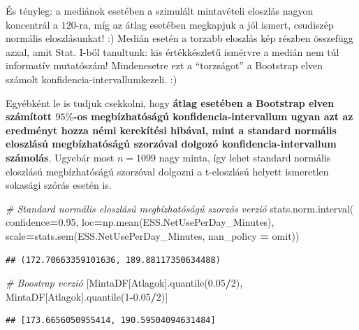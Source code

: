 \documentclass[
]{book}
\newenvironment{Shaded}{\begin{snugshade}}{\end{snugshade}}
\newcommand{\CommentTok}[1]{\textcolor[rgb]{0.56,0.35,0.01}{\textit{#1}}}
\newcommand{\DecValTok}[1]{\textcolor[rgb]{0.00,0.00,0.81}{#1}}
\newcommand{\FloatTok}[1]{\textcolor[rgb]{0.00,0.00,0.81}{#1}}
\newcommand{\NormalTok}[1]{#1}
\newcommand{\OperatorTok}[1]{\textcolor[rgb]{0.81,0.36,0.00}{\textbf{#1}}}
\newcommand{\StringTok}[1]{\textcolor[rgb]{0.31,0.60,0.02}{#1}}
\begin{document}
És tényleg: a mediánok esetében a szimulált mintavételi eloszlás nagyon koncentrál a \(120\)-ra, míg az átlag esetében megkapjuk a jól ismert, csudiszép normális eloszlásunkat! :)
Medián esetén a torzabb eloszlás kép részben összefügg azzal, amit Stat. I-ből tanultunk: kis értékkészletű ismérvre a medián nem túl informatív mutatószám! Mindenesetre ezt a ``torzságot'' a Bootstrap elven számolt konfidencia-intervallumkezeli. :)

Egyébként le is tudjuk csekkolni, hogy \textbf{átlag esetében a Bootstrap elven számított \(95\%\)-os megbízhatóságú konfidencia-intervallum ugyan azt az eredményt hozza némi kerekítési hibával, mint a standard normális eloszlású megbízhatóságú szorzóval dolgozó konfidencia-intervallum számolás}. Ugyebár most \(n=1099\) nagy minta, így lehet standard normális eloszlású megbízhatóságú szorzóval dolgozni a t-eloszlású helyett ismeretlen sokasági szórás esetén is.

\begin{Shaded}
\begin{Highlighting}[]
\CommentTok{\# Standard normális eloszlású megbízhatóságú szorzós verzió}
\NormalTok{stats.norm.interval(}
\NormalTok{  confidence}\OperatorTok{=}\FloatTok{0.95}\NormalTok{,}
\NormalTok{  loc}\OperatorTok{=}\NormalTok{np.mean(ESS.NetUsePerDay\_Minutes),}
\NormalTok{  scale}\OperatorTok{=}\NormalTok{stats.sem(ESS.NetUsePerDay\_Minutes, nan\_policy }\OperatorTok{=} \StringTok{\textquotesingle{}omit\textquotesingle{}}\NormalTok{))}
\end{Highlighting}
\end{Shaded}

\begin{verbatim}
## (172.70663359101636, 189.88117350634488)
\end{verbatim}

\begin{Shaded}
\begin{Highlighting}[]
  
\CommentTok{\# Boostrap verzió}
\NormalTok{[MintaDF[}\StringTok{\textquotesingle{}Atlagok\textquotesingle{}}\NormalTok{].quantile(}\FloatTok{0.05}\OperatorTok{/}\DecValTok{2}\NormalTok{), MintaDF[}\StringTok{\textquotesingle{}Atlagok\textquotesingle{}}\NormalTok{].quantile(}\DecValTok{1}\OperatorTok{{-}}\FloatTok{0.05}\OperatorTok{/}\DecValTok{2}\NormalTok{)]}
\end{Highlighting}
\end{Shaded}

\begin{verbatim}
## [173.6656050955414, 190.59504094631484]
\end{verbatim}
\end{document}
